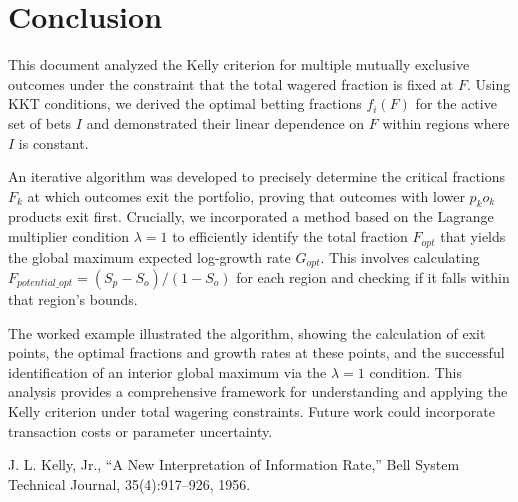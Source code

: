 \documentclass[11pt, letterpaper]{article}
\theoremstyle{definition}
\begin{document}
\section{Conclusion}
\label{sec:conclusion}

This document analyzed the Kelly criterion for multiple mutually exclusive outcomes under the constraint that the total wagered fraction is fixed at $F$. Using KKT conditions, we derived the optimal betting fractions $f_i(F)$ for the active set of bets $I$ and demonstrated their linear dependence on $F$ within regions where $I$ is constant.

An iterative algorithm was developed to precisely determine the critical fractions $F_k$ at which outcomes exit the portfolio, proving that outcomes with lower $p_k o_k$ products exit first. Crucially, we incorporated a method based on the Lagrange multiplier condition $\lambda=1$ to efficiently identify the total fraction $F_{opt}$ that yields the global maximum expected log-growth rate $G_{opt}$. This involves calculating $F_{potential\_opt} = (S_p - S_o) / (1 - S_o)$ for each region and checking if it falls within that region's bounds.

The worked example illustrated the algorithm, showing the calculation of exit points, the optimal fractions and growth rates at these points, and the successful identification of an interior global maximum via the $\lambda=1$ condition. This analysis provides a comprehensive framework for understanding and applying the Kelly criterion under total wagering constraints. Future work could incorporate transaction costs or parameter uncertainty.

\begin{thebibliography}{9}
    J. L. Kelly, Jr., ``A New Interpretation of Information Rate,'' Bell System Technical Journal, 35(4):917--926, 1956.
\end{thebibliography}
\end{document}

